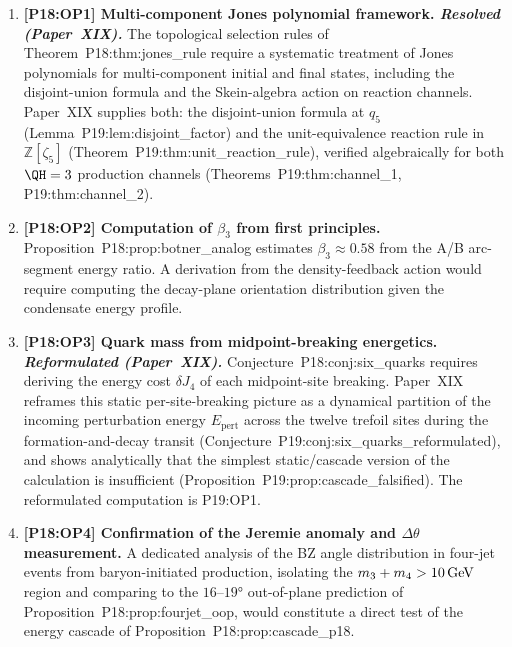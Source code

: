 \begin{enumerate}[label=,leftmargin=*]
\item \textbf{[P18:OP1] Multi-component Jones polynomial framework. \emph{Resolved (Paper~XIX).}}
The topological selection rules of Theorem~P18:thm:jones\_rule require a systematic
treatment of Jones polynomials for multi-component initial and final states,
including the disjoint-union formula and the Skein-algebra action on reaction
channels.
Paper~XIX supplies both: the disjoint-union formula at $q_5$
(Lemma~P19:lem:disjoint\_factor) and the unit-equivalence reaction rule in
$\mathbb{Z}[\zeta_5]$ (Theorem~P19:thm:unit\_reaction\_rule), verified
algebraically for both $\QH=3$ production channels
(Theorems~P19:thm:channel\_1, P19:thm:channel\_2).

\item \textbf{[P18:OP2] Computation of $\beta_3$ from first principles.}
Proposition~P18:prop:botner\_analog estimates $\beta_3\approx0.58$ from the A/B
arc-segment energy ratio. A derivation from the density-feedback action would
require computing the decay-plane orientation distribution given the
condensate energy profile.

\item \textbf{[P18:OP3] Quark mass from midpoint-breaking energetics. \emph{Reformulated (Paper~XIX).}}
Conjecture~P18:conj:six\_quarks requires deriving the energy cost $\delta J_4$ of
each midpoint-site breaking.
Paper~XIX reframes this static per-site-breaking picture as a dynamical
partition of the incoming perturbation energy $E_{\mathrm{pert}}$ across
the twelve trefoil sites during the formation-and-decay transit
(Conjecture~P19:conj:six\_quarks\_reformulated), and shows analytically
that the simplest static/cascade version of the calculation is
insufficient (Proposition~P19:prop:cascade\_falsified). The reformulated
computation is P19:OP1.

\item \textbf{[P18:OP4] Confirmation of the Jeremie anomaly and $\Delta\theta$ measurement.}
A dedicated analysis of the BZ angle distribution in four-jet events from
baryon-initiated production, isolating the $m_3+m_4>10\,{\rm GeV}$ region and
comparing to the $16$--$19°$ out-of-plane prediction of
Proposition~P18:prop:fourjet\_oop, would constitute a direct test of the energy
cascade of Proposition~P18:prop:cascade\_p18.


\end{enumerate}
